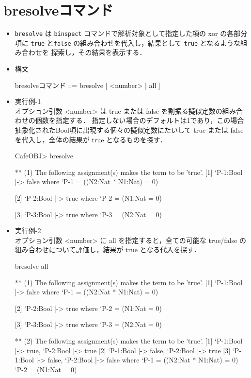 \documentclass[a4paper,oneside,10pt,here]{memoir}
\newenvironment{vvtm}%
{\parskip=0pt\lineskip=0pt\begin{center}\begin{minipage}{0.8\textwidth}\begin{snugshade}}%
  {\end{snugshade}\end{minipage}\end{center}}
\begin{document}
\section{bresolveコマンド}
\begin{itemize}
\item \verb|bresolve| は \verb|binspect| コマンドで解析対象として指定した項の xor の各部分項に
  \verb|true| と\verb|false| の組み合わせを代入し，結果として \verb|true| となるような組み合わせを
  探索し，その結果を表示する．
\item 構文
\begin{vvtm}
\begin{simplev}
bresolveコマンド ::= bresolve [ <number> | all ]
\end{simplev}
\end{vvtm}
\item 実行例-1 \\
  オプション引数 <number> は true または false を割振る擬似定数の組み合わせの個数を指定する．
  指定しない場合のデフォルトは1であり，この場合抽象化されたBool項に出現する個々の擬似定数にたいして true または
  false を代入し，全体の結果が true となるものを探す．
\begin{simplev}
CafeOBJ> bresolve

** (1) The following assignment(s) makes the term to be 'true'.
[1] { `P-1:Bool |-> false }
where
  `P-1 = ((N2:Nat * N1:Nat) = 0)
  
[2] { `P-2:Bool |-> true }
where
  `P-2 = (N1:Nat = 0)
  
[3] { `P-3:Bool |-> true }
where
  `P-3 = (N2:Nat = 0)
\end{simplev}

\item 実行例-2 \\
  オプション引数 <number> に all を指定すると，全ての可能な
  true/false の組み合わせについて評価し，結果が true となる代入を探す．
\begin{simplev}
bresolve all

** (1) The following assignment(s) makes the term to be 'true'.
[1] { `P-1:Bool |-> false }
where
  `P-1 = ((N2:Nat * N1:Nat) = 0)
  
[2] { `P-2:Bool |-> true }
where
  `P-2 = (N1:Nat = 0)
  
[3] { `P-3:Bool |-> true }
where
  `P-3 = (N2:Nat = 0)
  
** (2) The following assignment(s) makes the term to be 'true'.
[1] { `P-1:Bool |-> true, `P-2:Bool |-> true }
[2] { `P-1:Bool |-> false, `P-2:Bool |-> true }
[3] { `P-1:Bool |-> false, `P-2:Bool |-> false }
where
  `P-1 = ((N2:Nat * N1:Nat) = 0)
  `P-2 = (N1:Nat = 0)
  

\end{simplev}
\end{itemize}
\end{document}
